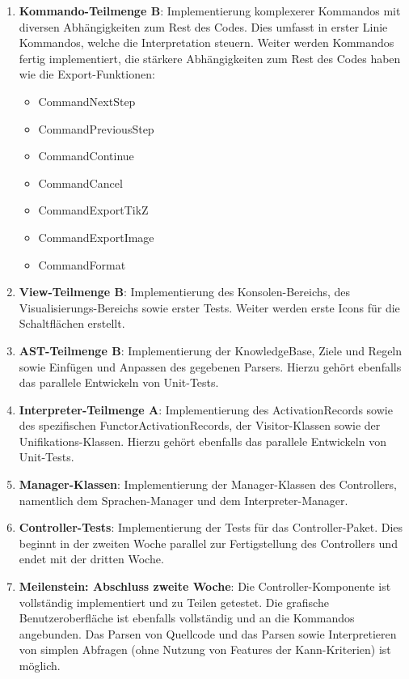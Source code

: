 \documentclass[parskip=full,11pt,twoside]{scrartcl}
\begin{document}
\begin{enumerate}
	\item \textbf{Kommando-Teilmenge B}: Implementierung komplexerer Kommandos mit diversen Abhängigkeiten zum Rest des Codes. Dies umfasst in erster Linie Kommandos, welche die Interpretation steuern. Weiter werden Kommandos fertig implementiert, die stärkere Abhängigkeiten zum Rest des Codes haben wie die Export-Funktionen:
	\begin{multicols}{3}
		\begin{itemize}
			\item CommandNextStep
			\item CommandPreviousStep
			\item CommandContinue
			\item CommandCancel
			
			\item CommandExportTikZ
			\item CommandExportImage
			\item CommandFormat
		\end{itemize}
	\end{multicols}

	\item \textbf{View-Teilmenge B}: Implementierung des Konsolen-Bereichs, des Visualisierungs-Bereichs sowie erster Tests. Weiter werden erste Icons für die Schaltflächen erstellt.

	\item \textbf{AST-Teilmenge B}: Implementierung der KnowledgeBase, Ziele und Regeln sowie Einfügen und Anpassen des gegebenen Parsers. Hierzu gehört ebenfalls das parallele Entwickeln von Unit-Tests.
	
	\item \textbf{Interpreter-Teilmenge A}: Implementierung des ActivationRecords sowie des spezifischen FunctorActivationRecords, der Visitor-Klassen sowie der Unifikations-Klassen. Hierzu gehört ebenfalls das parallele Entwickeln von Unit-Tests.
	
	\item \textbf{Manager-Klassen}: Implementierung der Manager-Klassen des Controllers, namentlich dem Sprachen-Manager und dem Interpreter-Manager.
	
	\item \textbf{Controller-Tests}: Implementierung der Tests für das Controller-Paket. Dies beginnt in der zweiten Woche parallel zur Fertigstellung des Controllers und endet mit der dritten Woche.
	
	\item \textbf{Meilenstein: Abschluss zweite Woche}: Die Controller-Komponente ist vollständig implementiert und zu Teilen getestet. Die grafische Benutzeroberfläche ist ebenfalls vollständig und an die Kommandos angebunden. Das Parsen von Quellcode und das Parsen sowie Interpretieren von simplen Abfragen (ohne Nutzung von Features der Kann-Kriterien) ist möglich.
	

\end{enumerate}
\end{document}
